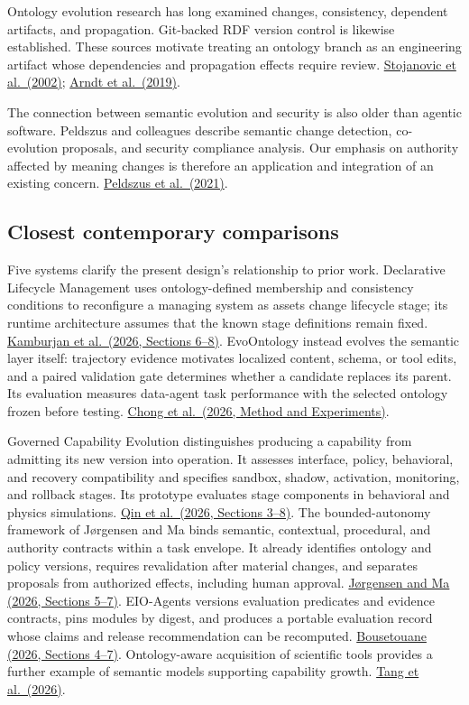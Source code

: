 \documentclass[preprint,12pt,authoryear]{elsarticle}
\begin{document}
Ontology evolution research has long examined changes, consistency,
dependent artifacts, and propagation. Git-backed RDF version control is
likewise established. These sources motivate treating an ontology branch
as an engineering artifact whose dependencies and propagation effects
require review.
\href{https://doi.org/10.1007/3-540-45810-7_27}{Stojanovic et
al.~(2002)}; \href{https://arxiv.org/abs/1805.03721}{Arndt et
al.~(2019)}.

The connection between semantic evolution and security is also older
than agentic software. Peldszus and colleagues describe semantic change
detection, co-evolution proposals, and security compliance analysis. Our
emphasis on authority affected by meaning changes is therefore an
application and integration of an existing concern.
\href{https://doi.org/10.1016/j.datak.2021.101907}{Peldszus et
al.~(2021)}.

\subsection{Closest contemporary
comparisons}\label{closest-contemporary-comparisons}

Five systems clarify the present design's relationship to prior work.
Declarative Lifecycle Management uses ontology-defined membership and
consistency conditions to reconfigure a managing system as assets change
lifecycle stage; its runtime architecture assumes that the known stage
definitions remain fixed.
\href{https://doi.org/10.1007/s10270-026-01358-w}{Kamburjan et
al.~(2026, Sections 6--8)}. EvoOntology instead evolves the semantic
layer itself: trajectory evidence motivates localized content, schema,
or tool edits, and a paired validation gate determines whether a
candidate replaces its parent. Its evaluation measures data-agent task
performance with the selected ontology frozen before testing.
\href{https://arxiv.org/abs/2609.15779v1}{Chong et al.~(2026, Method and
Experiments)}.

Governed Capability Evolution distinguishes producing a capability from
admitting its new version into operation. It assesses interface, policy,
behavioral, and recovery compatibility and specifies sandbox, shadow,
activation, monitoring, and rollback stages. Its prototype evaluates
stage components in behavioral and physics simulations.
\href{https://arxiv.org/abs/2604.08059v6}{Qin et al.~(2026, Sections
3--8)}. The bounded-autonomy framework of Jørgensen and Ma binds
semantic, contextual, procedural, and authority contracts within a task
envelope. It already identifies ontology and policy versions, requires
revalidation after material changes, and separates proposals from
authorized effects, including human approval.
\href{https://doi.org/10.3390/info17090923}{Jørgensen and Ma (2026,
Sections 5--7)}. EIO-Agents versions evaluation predicates and evidence
contracts, pins modules by digest, and produces a portable evaluation
record whose claims and release recommendation can be recomputed.
\href{https://arxiv.org/abs/2610.07675v1}{Bousetouane (2026, Sections
4--7)}. Ontology-aware acquisition of scientific tools provides a
further example of semantic models supporting capability growth.
\href{https://arxiv.org/abs/2607.28692v1}{Tang et al.~(2026)}.
\end{document}
